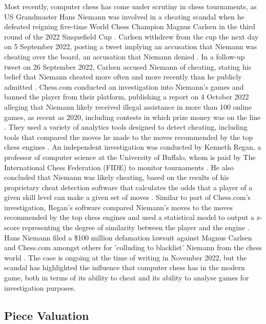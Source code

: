 \documentclass[%
 superscriptaddress,
showpacs,preprintnumbers,
 amsmath,
 amssymb,
 aps,
 pra,
showkeys,
onecolumn,
notitlepage,
11pt,
tightenlines      %
]{revtex4-1}
\begin{document}
Most recently, computer chess has come under scrutiny in chess tournaments, as US Grandmaster Hans Niemann was involved in a cheating scandal when he defeated reigning five-time World Chess Champion Magnus Carlsen in the third round of the 2022 Sinquefield Cup \cite{niemannDefeatsCarlsen}. Carlsen withdrew from the cup the next day on 5 September 2022, posting a tweet implying an accusation that Niemann was cheating over the board, an accusation that Niemann denied \cite{niemannCheatingAllegations}. In a follow-up tweet on 26 September 2022, Carlsen accused Niemann of cheating, stating his belief that Niemann cheated more often and more recently than he publicly admitted \cite{niemannCheatingAllegations2}. Chess.com conducted an investigation into Niemann's games and banned the player from their platform, publishing a report on 4 October 2022 alleging that Niemann likely received illegal assistance in more than 100 online games, as recent as 2020, including contests in which prize money was on the line \cite{niemannCheatingChessComReport}. They used a variety of analytics tools designed to detect cheating, including tools that compared the moves he made to the moves recommended by the top chess engines \cite{niemannCheatingChessComReport}. An independent investigation was conducted by Kenneth Regan, a professor of computer science at the University of Buffalo, whom is paid by The International Chess Federation (FIDE) to monitor tournaments \cite{niemannCheatingReganReport}. He also concluded that Niemann was likely cheating, based on the results of his proprietary cheat detection software that calculates the odds that a player of a given skill level can make a given set of moves \cite{niemannCheatingReganReport}. Similar to part of Chess.com's investigation, Regan's software compared Niemann's moves to the moves recommended by the top chess engines and used a statistical model to output a z-score representing the degree of similarity between the player and the engine \cite{niemannCheatingReganReport}. Hans Niemann filed a \$100 million defamation lawsuit against Magnus Carlsen and Chess.com amongst others for 'colluding to blacklist' Niemann from the chess world \cite{niemannCheatingDefamationLawsuit}. The case is ongoing at the time of writing in November 2022, but the scandal has highlighted the influence that computer chess has in the modern game, both in terms of its ability to cheat and its ability to analyse games for investigation purposes.

\subsection{Piece Valuation}
\end{document}
